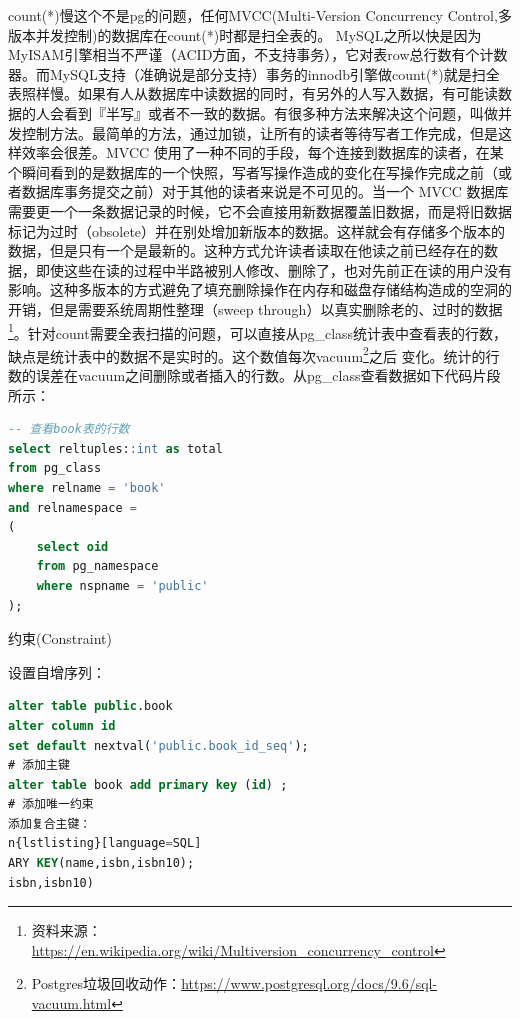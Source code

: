 \documentclass[8pt]{book}
\makeatletter
\numberwithin{dummy}{section}
\theoremstyle{ocrenumbox}
\theoremstyle{blacknumex}
\theoremstyle{blacknumbox}
\theoremstyle{ocrenum}
\renewcommand{\subsection}{\@startsection {subsection}{2}{\z@}
	{-3ex \@plus -0.1ex \@minus -.4ex}
	{0.5ex \@plus.2ex }
	{\normalfont\sffamily\bfseries}}
\newlength\esp
\makeatother
\begin{document}
count(*)慢这个不是pg的问题，任何MVCC(Multi-Version Concurrency Control,多版本并发控制)的数据库在count(*)时都是扫全表的。 MySQL之所以快是因为MyISAM引擎相当不严谨（ACID方面，不支持事务），它对表row总行数有个计数器。而MySQL支持（准确说是部分支持）事务的innodb引擎做count(*)就是扫全表照样慢。如果有人从数据库中读数据的同时，有另外的人写入数据，有可能读数据的人会看到『半写』或者不一致的数据。有很多种方法来解决这个问题，叫做并发控制方法。最简单的方法，通过加锁，让所有的读者等待写者工作完成，但是这样效率会很差。MVCC 使用了一种不同的手段，每个连接到数据库的读者，在某个瞬间看到的是数据库的一个快照，写者写操作造成的变化在写操作完成之前（或者数据库事务提交之前）对于其他的读者来说是不可见的。当一个 MVCC 数据库需要更一个一条数据记录的时候，它不会直接用新数据覆盖旧数据，而是将旧数据标记为过时（obsolete）并在别处增加新版本的数据。这样就会有存储多个版本的数据，但是只有一个是最新的。这种方式允许读者读取在他读之前已经存在的数据，即使这些在读的过程中半路被别人修改、删除了，也对先前正在读的用户没有影响。这种多版本的方式避免了填充删除操作在内存和磁盘存储结构造成的空洞的开销，但是需要系统周期性整理（sweep through）以真实删除老的、过时的数据\footnote{资料来源：\url{https://en.wikipedia.org/wiki/Multiversion_concurrency_control}}。针对count需要全表扫描的问题，可以直接从pg\_class统计表中查看表的行数，缺点是统计表中的数据不是实时的。这个数值每次vacuum\footnote{Postgres垃圾回收动作：\url{https://www.postgresql.org/docs/9.6/sql-vacuum.html}}之后
变化。统计的行数的误差在vacuum之间删除或者插入的行数。从pg\_class查看数据如下代码片段所示：

\begin{lstlisting}[language=SQL]
-- 查看book表的行数
select reltuples::int as total 
from pg_class 
where relname = 'book' 
and relnamespace = 
(
	select oid 
	from pg_namespace 
	where nspname = 'public'
);
\end{lstlisting}

\subsection{约束(Constraint)}

设置自增序列：

\begin{lstlisting}[language=SQL]
alter table public.book 
alter column id 
set default nextval('public.book_id_seq');
# 添加主键
alter table book add primary key (id) ;
# 添加唯一约束
添加复合主键：
n{lstlisting}[language=SQL]
ARY KEY(name,isbn,isbn10);
isbn,isbn10)
\end{lstlisting}
\end{document}
